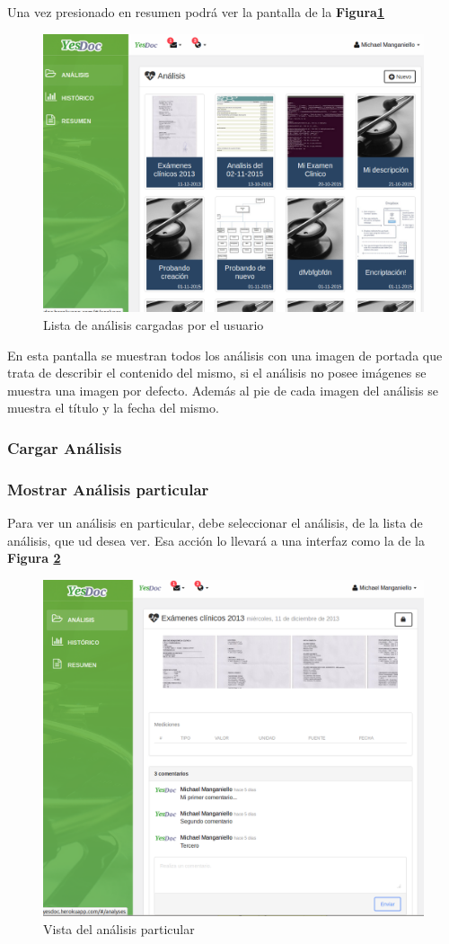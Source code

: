 \documentclass[a4paper,12pt]{article}
\begin{document}
Una vez presionado en resumen podrá ver la pantalla de la \textbf{Figura\ref{mu-listar_analisis}}


\begin{figure}
	\centering
	\includegraphics[width=.8\textwidth]{img/manual_de_usuario/listar_analisis}
	\caption{Lista de análisis cargadas por el usuario}
	\label{mu-listar_analisis}
\end{figure}
 
 
 En esta pantalla se muestran todos los análisis con una imagen de portada que trata de describir el contenido del mismo, si el análisis no posee imágenes se muestra una imagen por defecto. Además al pie de cada imagen del análisis se muestra el título y la fecha del mismo.
 
 \subsubsection{Cargar Análisis}
 \subsubsection{Mostrar Análisis particular}
Para ver un análisis en particular, debe seleccionar el análisis, de la lista de análisis, que ud desea ver. Esa acción lo llevará a una interfaz como la de la \textbf{Figura \ref{mu-analisis_particular}}
\begin{figure}
	\centering
	\includegraphics[width=.8\textwidth]{img/manual_de_usuario/analisis_particular}
	\caption{Vista del análisis particular}
	\label{mu-analisis_particular}
\end{figure}
\end{document}
